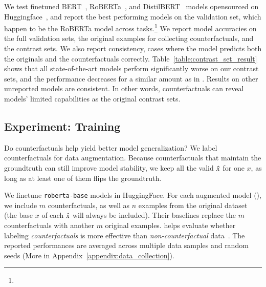 We test finetuned BERT~\cite{devlin-etal-2019-bert}, RoBERTa~\cite{liu2019roberta}, and DistilBERT~\cite{Sanh2019DistilBERTAD} models opensourced on Huggingface~\cite{Wolf2019HuggingFacesTS}, and report the best performing models on the validation set, which happen to be the RoBERTa model across tasks.\footnote{
}
We report model accuracies on the full validation sets, the original examples for collecting counterfactuals, and the contrast sets.
We also report consistency, \ie cases where the model predicts both the originals and the counterfactuals correctly.
Table~\ref{table:contrast_set_result} shows that all state-of-the-art models perform significantly worse on our contrast sets, and the performance decreases for a similar amount as in \cite{gardner2020contrast}.
Results on other unreported models are consistent.
In other words, \sysname counterfactuals can reveal models' limited capabilities as the original contrast sets.


\subsection{Experiment: Training}

\label{subsec:augmentation}
Do \sysname counterfactuals help yield better model generalization? 
We label counterfactuals for data augmentation.
Because counterfactuals that maintain the groundtruth can still improve model stability, we keep all the valid $\hat{x}$ for one $x$, as long as at least one of them flips the groundtruth.

We finetune \texttt{roberta-base} models in HuggingFace.
For each augmented model (\maug), we include $m$ counterfactuals, as well as $n$ examples from the original dataset (the base $x$ of each $\hat{x}$ will always be included).
Their baselines \mcomp replace the $m$ counterfactuals with another $m$ original examples.
\mcomp helps evaluate whether labeling \emph{counterfactuals} is more effective than \emph{non-counterfactual} data~\cite{Khashabi2020MoreBF}.
The reported performances are averaged across multiple data samples and random seeds (More in Appendix~\ref{appendix:data_collection}).

